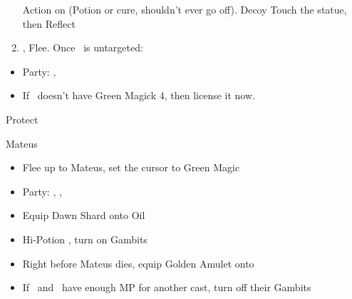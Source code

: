 \begin{enumerate}[resume]
	\penelof Action on \vaan (Potion or cure, shouldn't ever go off).
	      \ashef Decoy \vaan
	      \vaanf Touch the statue, then Reflect \vaan
\item \leader{\penelo}, Flee. Once \vaan\ is untargeted:
\end{enumerate}
\begin{menu}
\begin{itemize}
\item Party: \basch, \balthier
\battleslow
\item If \penelo\ doesn't have Green Magick 4, then license it now.
\end{itemize}
\end{menu}
\begin{enumerate}[resume]
	\balthierf Protect \basch
\end{enumerate}
\begin{battle}{Mateus}
	\begin{itemize}
		\item Flee up to Mateus, set the cursor to Green Magic
		\item Party: \vaan, \ashe, \penelo
		\item Equip Dawn Shard onto \vaan
		      \penelof Oil \penelo
		      \item \GirlsGambitOn
		      \vaanf Hi-Potion \vaan, turn on Gambits
		      \item Right before Mateus dies, equip Golden Amulet onto \vaan
		      \item If \ashe\ and \penelo\ have enough MP for another cast, turn off their Gambits
	\end{itemize}
\end{battle}